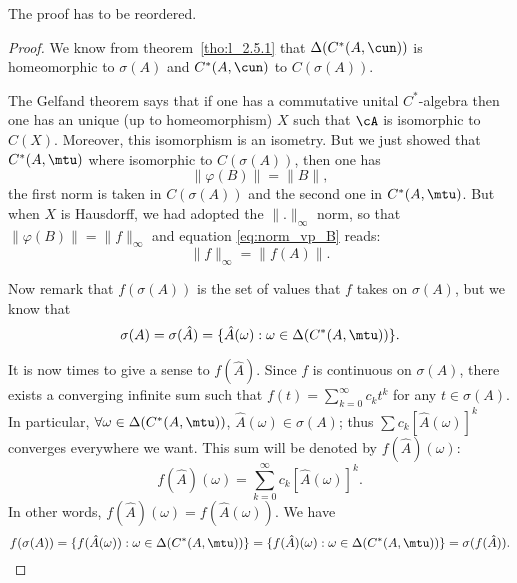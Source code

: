 \begin{probleme}
	The proof has to be reordered.
\end{probleme}

\begin{proof}
	We know from theorem~\ref{tho:l_2.5.1} that $\Delta(C^*(A,\cun))$ is homeomorphic to $\sigma(A)$ and $C^*(A,\cun)$ to $C(\sigma(A))$.

	The Gelfand theorem says that if one has a commutative unital $C^{*}$-algebra then  one has an unique (up to homeomorphism) $X$ such that $\cA$ is isomorphic to $C(X)$. Moreover, this isomorphism is an isometry. But we just showed that $C^*(A,\mtu)$ where isomorphic to $C(\sigma(A))$, then one has
	\begin{equation}\label{eq:norm_vp_B}
		\|\varphi(B)\|=\|B\|,
	\end{equation}
	the first norm is taken in $C(\sigma(A))$ and the second one in $C^*(A,\mtu)$. But when $X$ is Hausdorff, we had adopted the $\|.\|_{\infty}$ norm, so that $\|\varphi(B)\|=\|f\|_{\infty}$ and equation \eqref{eq:norm_vp_B} reads:
	\begin{equation}
		\|f\|_{\infty}=\|f(A)\|.
	\end{equation}

	Now remark that $f(\sigma(A))$ is the set of values that $f$ takes on $\sigma(A)$, but we know that
	\[
		\sigma(A)=\sigma(\hat A)=\{ \hat A(\omega):\omega\in\Delta(C^*(A,\mtu)) \}.
	\]

	It is now times to give a sense to $f(\hat{A})$.  Since $f$ is continuous on $\sigma(A)$, there exists a converging infinite sum such that $f(t)=\sum_{k=0}^{\infty}c_kt^k$ for any $t\in\sigma(A)$. In particular, $\forall\omega\in\Delta(C^*(A,\mtu))$, $\hat A(\omega)\in\sigma(A)$; thus
	$\sum c_k[\hat A(\omega)]^k$ converges everywhere we want. This sum will be denoted by $f(\hat{A})(\omega)$:
	\begin{equation}
		f(\hat A)(\omega)=\sum_{k=0}^{\infty}c_k[\hat A(\omega)]^k.
	\end{equation}
	In other words, $f(\hat A)(\omega)=f(\hat A(\omega))$. We have
	\begin{equation}
		f(\sigma(A))=\{f(\hat A(\omega)):\omega\in\Delta( C^*(A,\mtu) )\}
		=\{ f(\hat A)(\omega):\omega\in\Delta( C^*(A,\mtu) ) \}
		=\sigma(f(\hat A)).
	\end{equation}



\end{proof}
